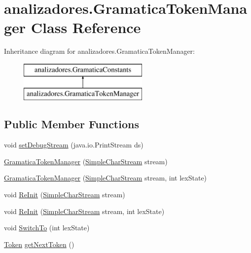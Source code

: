 \hypertarget{classanalizadores_1_1_gramatica_token_manager}{}\section{analizadores.\+Gramatica\+Token\+Manager Class Reference}
\label{classanalizadores_1_1_gramatica_token_manager}
Inheritance diagram for analizadores.\+Gramatica\+Token\+Manager\+:\begin{figure}[H]
\begin{center}
\leavevmode
\includegraphics[height=2.000000cm]{classanalizadores_1_1_gramatica_token_manager}
\end{center}
\end{figure}
\subsection*{Public Member Functions}
\begin{DoxyCompactItemize}
\item 
void \mbox{\hyperlink{classanalizadores_1_1_gramatica_token_manager_a4dd7de62a7a2539af8844d147a128e74}{set\+Debug\+Stream}} (java.\+io.\+Print\+Stream ds)
\item 
\mbox{\hyperlink{classanalizadores_1_1_gramatica_token_manager_a6f39567296f646a754c87ca62cb7d78a}{Gramatica\+Token\+Manager}} (\mbox{\hyperlink{classanalizadores_1_1_simple_char_stream}{Simple\+Char\+Stream}} stream)
\item 
\mbox{\hyperlink{classanalizadores_1_1_gramatica_token_manager_a40bcd4b1673f1a37f1fac721ae154049}{Gramatica\+Token\+Manager}} (\mbox{\hyperlink{classanalizadores_1_1_simple_char_stream}{Simple\+Char\+Stream}} stream, int lex\+State)
\item 
void \mbox{\hyperlink{classanalizadores_1_1_gramatica_token_manager_a921966cc3d3430d9556f04cc4eddca0f}{Re\+Init}} (\mbox{\hyperlink{classanalizadores_1_1_simple_char_stream}{Simple\+Char\+Stream}} stream)
\item 
void \mbox{\hyperlink{classanalizadores_1_1_gramatica_token_manager_af95f8e720b5ee73b721aa490314ca933}{Re\+Init}} (\mbox{\hyperlink{classanalizadores_1_1_simple_char_stream}{Simple\+Char\+Stream}} stream, int lex\+State)
\item 
void \mbox{\hyperlink{classanalizadores_1_1_gramatica_token_manager_a8b938e445d55a0175957f9fce191581f}{Switch\+To}} (int lex\+State)
\item 
\mbox{\hyperlink{classanalizadores_1_1_token}{Token}} \mbox{\hyperlink{classanalizadores_1_1_gramatica_token_manager_a590a26d78e526ad8fa116390c45b7010}{get\+Next\+Token}} ()
\end{DoxyCompactItemize}

